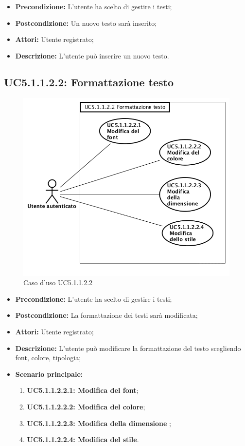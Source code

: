 \begin{itemize}
	\item \textbf{Precondizione:} L'utente ha scelto di gestire i testi;
	\item \textbf{Postcondizione:} Un nuovo testo sarà inserito;
	\item \textbf{Attori:} Utente registrato;
	\item \textbf{Descrizione:} L'utente può inserire un nuovo testo.
\end{itemize}
\subsection{ UC5.1.1.2.2: Formattazione testo}

\begin{figure}[h]
	\begin{center}
	\includegraphics[scale=0.4]{diagram/UC5-1-1-2-2.png}
	\caption{Caso d'uso UC5.1.1.2.2}
	\end{center}
\end{figure}
\begin{itemize}
	\item \textbf{Precondizione:} L'utente ha scelto di gestire i testi;
	\item \textbf{Postcondizione:} La formattazione dei testi sarà modificata;
	\item \textbf{Attori:} Utente registrato;
	\item \textbf{Descrizione:} L'utente può modificare la formattazione del testo scegliendo font, colore, tipologia;
	\item \textbf{Scenario principale:}
	\begin{enumerate}
		\item \textbf{ UC5.1.1.2.2.1: Modifica del font};
		\item \textbf{ UC5.1.1.2.2.2: Modifica del colore};
		\item \textbf{ UC5.1.1.2.2.3: Modifica della dimensione };
		\item \textbf{ UC5.1.1.2.2.4: Modifica del stile}.
	\end{enumerate}
\end{itemize}
